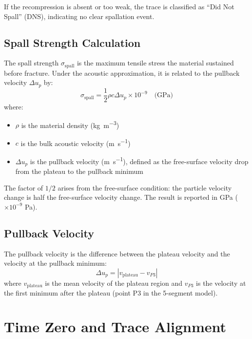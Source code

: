 If the recompression is absent or too weak, the trace is classified as ``Did Not Spall'' (DNS), indicating no clear spallation event.

\subsection{Spall Strength Calculation}
The spall strength $\sigma_{\text{spall}}$ is the maximum tensile stress the material sustained before fracture. Under the acoustic approximation, it is related to the pullback velocity $\Delta u_p$ by:
\begin{equation}
\sigma_{\text{spall}} = \frac{1}{2} \rho c \Delta u_p \times 10^{-9} \quad \text{(GPa)}
\end{equation}
where:
\begin{itemize}
    \item $\rho$ is the material density (\si{\kilogram\per\cubic\meter})
    \item $c$ is the bulk acoustic velocity (\si{\meter\per\second})
    \item $\Delta u_p$ is the pullback velocity (\si{\meter\per\second}), defined as the free-surface velocity drop from the plateau to the pullback minimum
\end{itemize}

The factor of $1/2$ arises from the free-surface condition: the particle velocity change is half the free-surface velocity change. The result is reported in GPa ($\times 10^{-9}$ Pa).

\subsection{Pullback Velocity}
The pullback velocity is the difference between the plateau velocity and the velocity at the pullback minimum:
\begin{equation}
\Delta u_p = \left| v_{\text{plateau}} - v_{P3} \right|
\end{equation}
where $v_{\text{plateau}}$ is the mean velocity of the plateau region and $v_{P3}$ is the velocity at the first minimum after the plateau (point P3 in the 5-segment model).

\section{Time Zero and Trace Alignment}

